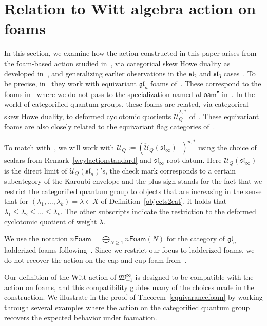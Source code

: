 \documentclass{amsart}
\numberwithin{equation}{section}
\theoremstyle{definition}
\newcommand{\Ucat}{\mathcal{U}_Q}
\newcommand{\witt}{{\mathfrak{W}}}
\newcommand{\ourwitt}{{\witt_{-1}^{\infty}}}
\begin{document}
\section{Relation to Witt algebra action on foams}
In this section, we examine how the action constructed in this paper arises from the foam-based action studied in~\cite{qi2024symmetriesmathfrakglnfoams}, via categorical skew Howe duality as developed in~\cite{QR}, and generalizing earlier observations in the $\mathfrak{sl}_2$ and $\mathfrak{sl}_3$ cases~\cite{Lau-skew}. 
%
To be precise, in~\cite{qi2024symmetriesmathfrakglnfoams} they work with equivariant $\mathfrak{gl}_n$ foams of~\cite{Robert2020-xp}. These correspond to the foams in~\cite{QR} where we do not pass to the specialization named $n\mathsf{Foam}^{\bullet}$ in~\cite[Section 4.1]{QR}. In the world of categorified quantum groups, these foams are related, via categorical skew Howe duality, to deformed cyclotomic quotients $\check{\mathcal{U}}_Q^{\lambda,\ast}$ of~\cite{RouQH,Webster_2017}.  These equivariant foams are also closely related to the equivariant flag categories of~\cite{Lau2,KL3}. 

To match with~\cite{QR}, we will work with $\Ucat := (\check{\mathcal{U}}_Q(\mathfrak{sl}_{\infty})^+)^{n,\ast}$ using the choice of scalars from Remark~\ref{weylactionstandard} and $\mathfrak{sl}_{\infty}$ root datum. Here $\Ucat(\mathfrak{sl}_{\infty})$ is the direct limit of $\Ucat(\mathfrak{sl}_{n})$'s, the check mark corresponds to a certain subcategory of the Karoubi envelope and the plus sign stands for the fact that we restrict the categorified quantum group to objects that are increasing in the sense that for $(\lambda_1, \ldots, \lambda_k) = \lambda \in X$ of Definition~\ref{objects2cat}, it holds that $\lambda_1 \leq \lambda_2 \leq \ldots \leq \lambda_k$. The other subscripts indicate the restriction to the deformed cyclotomic quotient of weight $\lambda$.

We use the notation $n\mathsf{Foam} = \bigoplus_{N \geq 1} n \mathsf{Foam}(N)$ for the category of $\mathfrak{gl}_n$ ladderized foams following~\cite{QR}. Since we restrict our focus to ladderized foams, we do not recover the action on the cap and cup foam from~\cite[Equations 68, 69]{qi2024symmetriesmathfrakglnfoams}.

Our definition of the Witt action of $\ourwitt$ is designed to be compatible with the action on foams, and this compatibility guides many of the choices made in the construction. We illustrate in the proof of Theorem~\ref{equivarancefoam}  by working through several examples where the action on the categorified quantum group recovers the expected behavior under foamation.
\end{document}
